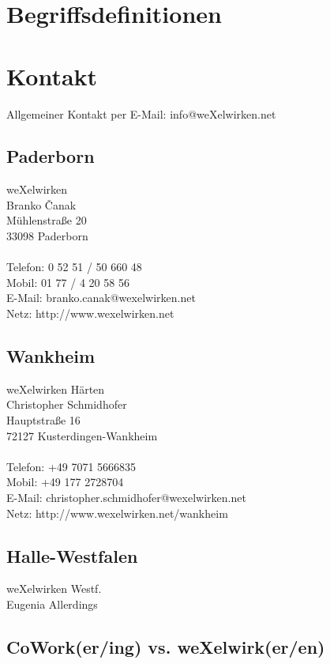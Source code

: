 \begin{appendix}


\chapter{Begriffsdefinitionen}
  \chapter{Kontakt}
Allgemeiner Kontakt per E-Mail: info@weXelwirken.net
    \section{Paderborn}
weXelwirken\\
Branko Čanak\\
Mühlenstraße 20\\
33098 Paderborn\\
\\
Telefon: 0 52 51 / 50 660 48\\
Mobil: 01 77 / 4 20 58 56\\
E-Mail: branko.canak@wexelwirken.net\\
Netz: http://www.wexelwirken.net\\
    \section{Wankheim}
weXelwirken Härten\\
Christopher Schmidhofer\\
Hauptstraße 16\\
72127 Kusterdingen-Wankheim\\
\\
Telefon: +49 7071 5666835\\
Mobil: +49 177 2728704\\
E-Mail: christopher.schmidhofer@wexelwirken.net\\
Netz: http://www.wexelwirken.net/wankheim\\
    \section{Halle-Westfalen}
weXelwirken Westf.\\
Eugenia Allerdings\\


  \section{CoWork(er/ing) vs. weXelwirk(er/en)}




\end{appendix}
